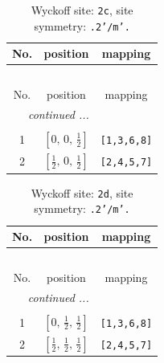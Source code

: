 \documentclass[fleqn,8pt]{jsarticle}
\begin{document}
\begin{longtable}{ccc}
\caption{Wyckoff site: {\tt 2c}, site symmetry: {\tt .2'/m'.}}
 \\
 \hline \hline
No. & position & mapping \\ \hline \endfirsthead

\multicolumn{2}{l}{\tablename\ \thetable{}} \\
 \hline \hline
No. & position & mapping \\ \hline \endhead

 \hline \hline
\multicolumn{2}{r}{\footnotesize\it continued ...} \\ \endfoot

 \hline \hline
\multicolumn{2}{r}{} \\ \endlastfoot

1 & $\left[ 0,\, 0,\, \frac{1}{2} \right]$ & {\tt [1,3,6,8]} \\ \hline
2 & $\left[ \frac{1}{2},\, 0,\, \frac{1}{2} \right]$ & {\tt [2,4,5,7]} \\
\end{longtable}
\renewcommand{\arraystretch}{1.2}
\begin{longtable}{ccc}
\caption{Wyckoff site: {\tt 2d}, site symmetry: {\tt .2'/m'.}}
 \\
 \hline \hline
No. & position & mapping \\ \hline \endfirsthead

\multicolumn{2}{l}{\tablename\ \thetable{}} \\
 \hline \hline
No. & position & mapping \\ \hline \endhead

 \hline \hline
\multicolumn{2}{r}{\footnotesize\it continued ...} \\ \endfoot

 \hline \hline
\multicolumn{2}{r}{} \\ \endlastfoot

1 & $\left[ 0,\, \frac{1}{2},\, \frac{1}{2} \right]$ & {\tt [1,3,6,8]} \\ \hline
2 & $\left[ \frac{1}{2},\, \frac{1}{2},\, \frac{1}{2} \right]$ & {\tt [2,4,5,7]} \\
\end{longtable}
\renewcommand{\arraystretch}{1.2}
\end{document}
